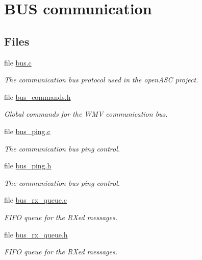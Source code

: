 \hypertarget{group__bus__group}{
\section{BUS communication}
\label{group__bus__group}
}
\subsection*{Files}
\begin{CompactItemize}
\item 
file \hyperlink{bus_8c}{bus.c}
\begin{CompactList}\small\item\em The communication bus protocol used in the openASC project. \item\end{CompactList}

\item 
file \hyperlink{bus__commands_8h}{bus\_\-commands.h}
\begin{CompactList}\small\item\em Global commands for the WMV communication bus. \item\end{CompactList}

\item 
file \hyperlink{bus__ping_8c}{bus\_\-ping.c}
\begin{CompactList}\small\item\em The communication bus ping control. \item\end{CompactList}

\item 
file \hyperlink{bus__ping_8h}{bus\_\-ping.h}
\begin{CompactList}\small\item\em The communication bus ping control. \item\end{CompactList}

\item 
file \hyperlink{bus__rx__queue_8c}{bus\_\-rx\_\-queue.c}
\begin{CompactList}\small\item\em FIFO queue for the RXed messages. \item\end{CompactList}

\item 
file \hyperlink{bus__rx__queue_8h}{bus\_\-rx\_\-queue.h}
\begin{CompactList}\small\item\em FIFO queue for the RXed messages. \item\end{CompactList}


\end{CompactItemize}

